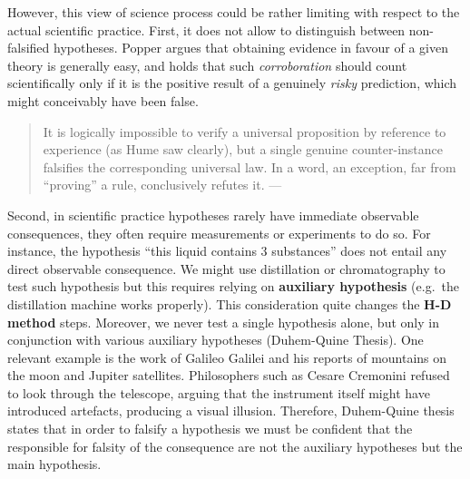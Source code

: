 \documentclass[
]{book}
\begin{document}
However, this view of science process could be rather limiting with respect to the actual scientific practice. First, it does not allow to distinguish between non-falsified hypotheses. Popper argues that obtaining evidence in favour of a given theory is generally easy, and holds that such \emph{corroboration} should count scientifically only if it is the positive result of a genuinely \emph{risky} prediction, which might conceivably have been false.

\begin{quote}
It is logically impossible to verify a universal proposition by reference to experience (as Hume saw clearly), but a single genuine counter-instance falsifies the corresponding universal law. In a word, an exception, far from ``proving'' a rule, conclusively refutes it. --- \citep{sep-popper}
\end{quote}

Second, in scientific practice hypotheses rarely have immediate observable consequences, they often require measurements or experiments to do so. For instance, the hypothesis ``this liquid contains 3 substances'' does not entail any direct observable consequence. We might use distillation or chromatography to test such hypothesis but this requires relying on \textbf{auxiliary hypothesis} (e.g.~the distillation machine works properly). This consideration quite changes the \textbf{H-D method} steps. Moreover, we never test a single hypothesis alone, but only in conjunction with various auxiliary hypotheses (Duhem-Quine Thesis). One relevant example is the work of Galileo Galilei and his reports of mountains on the moon and Jupiter satellites. Philosophers such as Cesare Cremonini refused to look through the telescope, arguing that the instrument itself might have introduced artefacts, producing a visual illusion. Therefore, Duhem-Quine thesis states that in order to falsify a hypothesis we must be confident that the responsible for falsity of the consequence are not the auxiliary hypotheses but the main hypothesis.
\end{document}
